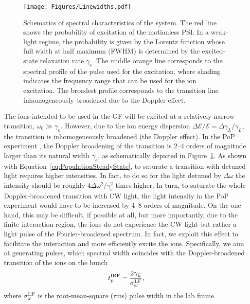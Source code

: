 \begin{figure}[!htbp]
    \centering
    \texttt{[image: Figures/Linewidths.pdf]}
    \caption{Schematics of spectral characteristics of the system. The red line shows the probability of excitation of the motionless PSI. In a weak-light regime, the probability is given by the Lorentz function whose full width at half maximum (FWHM) is determined by the excited-state relaxation rate $\gamma_e$. The middle orange line corresponds to the spectral profile of the pulse used for the excitation, where shading indicates the frequency range that can be used for the ion excitation. The broadest profile corresponds to the transition line inhomogeneously broadened due to the Doppler effect.}
    \label{fig:SchematicExcitation}
\end{figure}

The ions intended to be used in the GF will be excited at a relatively narrow transition, $\omega_0\gg\gamma_e$.  However, due to the ion energy dispersion 
$\Delta \mathcal{E}/\mathcal{E}=\Delta\gamma_L/\gamma_L$, the transition is inhomogeneously broadened (the Doppler effect).  In the PoP experiment \cite{GF-PoP-LoI:2019}, the Doppler broadening of the transition is 2--4 orders of magnitude larger than its natural width $\gamma_e$, as schematically depicted in Figure~\ref{fig:SchematicExcitation}.  As shown with Equation~\ref{eq:PopulationSteadyState}, to saturate a transition with detuned light requires higher intensities. In fact, to do so for the light detuned by $\Delta\omega$ the intensity should be roughly $4\Delta\omega^2/\gamma_e^2$ times higher. In turn, to saturate the whole Doppler-broadened transition with CW light, the light intensity in the PoP experiment would have to be increased by 4--8 orders of magnitude. On the one hand, this may be difficult, if possible at all, but more importantly, due to the finite interaction region, the ions do not experience the CW light but rather a light pulse of the Fourier-broadened spectrum.  In fact, we exploit this effect to facilitate the interaction and more efficiently excite the ions.  Specifically, we aim at generating pulses, which spectral width coincides with the Doppler-broadened transition of the ions on the bunch
\begin{equation}
    t_p^{\rm IRF}=\frac{2\gamma_L}{\sigma^{\rm LF}_\omega},
\end{equation}
where $\sigma^{\rm LF}_\omega$ is the root-mean-square (rms) pulse width in the lab frame.

